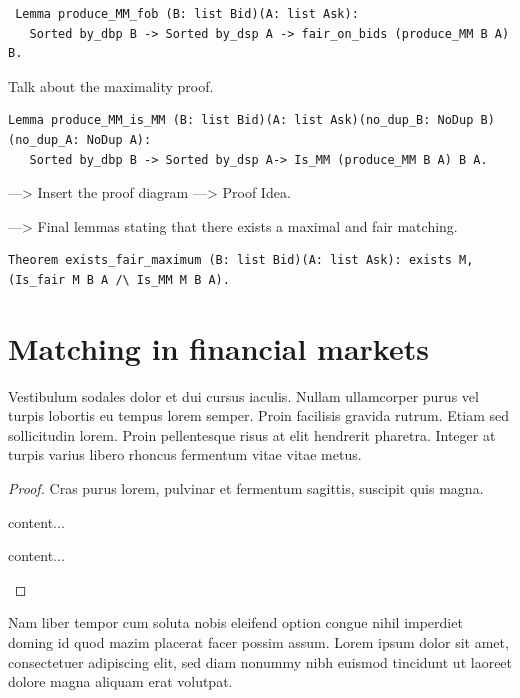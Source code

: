 \documentclass[a4paper,UKenglish,cleveref, autoref]{lipics-v2019}
\begin{document}
\begin{verbatim}
 Lemma produce_MM_fob (B: list Bid)(A: list Ask):
   Sorted by_dbp B -> Sorted by_dsp A -> fair_on_bids (produce_MM B A) B.
\end{verbatim}

Talk about the maximality proof. 
\begin{verbatim}
Lemma produce_MM_is_MM (B: list Bid)(A: list Ask)(no_dup_B: NoDup B)(no_dup_A: NoDup A):
   Sorted by_dbp B -> Sorted by_dsp A-> Is_MM (produce_MM B A) B A.
\end{verbatim}
---> Insert the proof diagram 
---> Proof Idea. 

---> Final lemmas stating that there exists a maximal and fair matching.
\begin{verbatim}
Theorem exists_fair_maximum (B: list Bid)(A: list Ask): exists M, (Is_fair M B A /\ Is_MM M B A).
\end{verbatim}

\section{Matching in financial markets}
\newpage

 

\begin{lemma}
\label{lemma:lorem}
Vestibulum sodales dolor et dui cursus iaculis. Nullam ullamcorper purus vel turpis lobortis eu tempus lorem semper. Proin facilisis gravida rutrum. Etiam sed sollicitudin lorem. Proin pellentesque risus at elit hendrerit pharetra. Integer at turpis varius libero rhoncus fermentum vitae vitae metus.
\end{lemma}

\begin{proof}
Cras purus lorem, pulvinar et fermentum sagittis, suscipit quis magna.

\begin{claim}
content...
\end{claim}
\begin{claimproof}
content...
\end{claimproof}

\end{proof}

\begin{corollary}
\label{lemma:curabitur}
Nam liber tempor cum soluta nobis eleifend option congue nihil imperdiet doming id quod mazim placerat facer possim assum. Lorem ipsum dolor sit amet, consectetuer adipiscing elit, sed diam nonummy nibh euismod tincidunt ut laoreet dolore magna aliquam erat volutpat.
\end{corollary}
\end{document}
